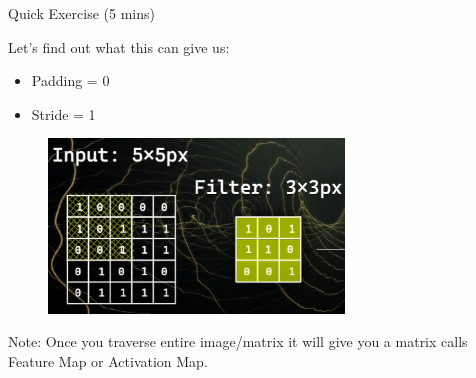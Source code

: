 \begin{frame}{Quick Exercise (5 mins)}
    \begin{block}{Let’s find out what this can give us:}
        \begin{itemize}
            \item Padding = 0
            \item Stride = 1
        \end{itemize}
    \end{block}
    \begin{figure}
    \centering
    \includegraphics[width=0.7\textwidth,height=0.7\textheight,keepaspectratio]{images/cnn-exercise-1.png}
    \end{figure}

    Note: Once you traverse entire image/matrix it will give you a matrix calls Feature Map or Activation Map.
\end{frame}